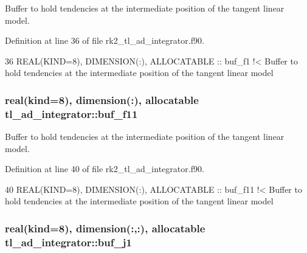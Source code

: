 Buffer to hold tendencies at the intermediate position of the tangent linear model. 



Definition at line 36 of file rk2\+\_\+tl\+\_\+ad\+\_\+integrator.\+f90.


\begin{DoxyCode}
36   \textcolor{keywordtype}{REAL(KIND=8)}, \textcolor{keywordtype}{DIMENSION(:)}, \textcolor{keywordtype}{ALLOCATABLE} :: buf\_f1\textcolor{comment}{ !< Buffer to hold tendencies at the intermediate
       position of the tangent linear model}
\end{DoxyCode}
\subsubsection[{\texorpdfstring{buf\+\_\+f11}{buf_f11}}]{\setlength{\rightskip}{0pt plus 5cm}real(kind=8), dimension(\+:), allocatable tl\+\_\+ad\+\_\+integrator\+::buf\+\_\+f11\hspace{0.3cm}{\ttfamily [private]}}\hypertarget{namespacetl__ad__integrator_ad772309f6a78f335766cec48e65747ba}{}\label{namespacetl__ad__integrator_ad772309f6a78f335766cec48e65747ba}


Buffer to hold tendencies at the intermediate position of the tangent linear model. 



Definition at line 40 of file rk2\+\_\+tl\+\_\+ad\+\_\+integrator.\+f90.


\begin{DoxyCode}
40   \textcolor{keywordtype}{REAL(KIND=8)}, \textcolor{keywordtype}{DIMENSION(:)}, \textcolor{keywordtype}{ALLOCATABLE} :: buf\_f11\textcolor{comment}{ !< Buffer to hold tendencies at the intermediate
       position of the tangent linear model}
\end{DoxyCode}
\subsubsection[{\texorpdfstring{buf\+\_\+j1}{buf_j1}}]{\setlength{\rightskip}{0pt plus 5cm}real(kind=8), dimension(\+:,\+:), allocatable tl\+\_\+ad\+\_\+integrator\+::buf\+\_\+j1\hspace{0.3cm}{\ttfamily [private]}}\hypertarget{namespacetl__ad__integrator_abf7d3c46036ca20cca151adc20a2fa14}{}\label{namespacetl__ad__integrator_abf7d3c46036ca20cca151adc20a2fa14}


